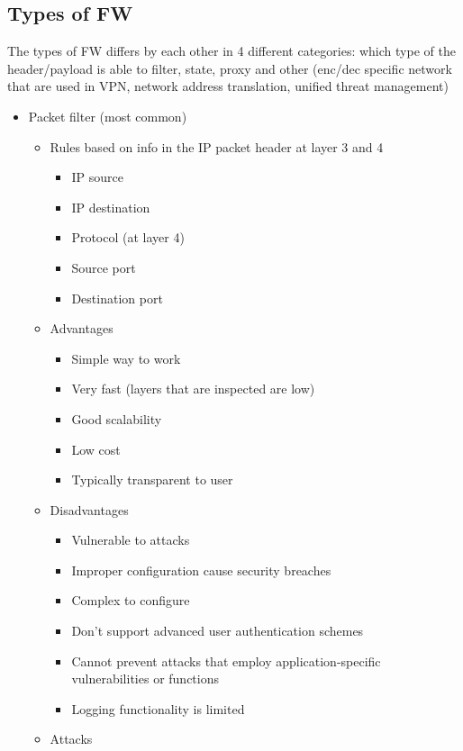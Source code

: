 \documentclass{article}
\begin{document}
\subsection{Types of FW}
The types of FW differs by each other in 4 different categories: which type of the header/payload is able to filter, state, proxy and other (enc/dec specific network that are used in VPN, network address translation, unified threat management)
\begin{itemize}
  \item Packet filter (most common) 
    \begin{itemize}
      \item Rules based on info in the IP packet header at layer 3 and 4
        \begin{itemize}
          \item IP source
          \item IP destination
          \item Protocol (at layer 4)
          \item Source port
          \item Destination port
        \end{itemize}
      \item Advantages
        \begin{itemize}
          \item Simple way to work
          \item Very fast (layers that are inspected are low)
          \item Good scalability
          \item Low cost
          \item Typically transparent to user
        \end{itemize}
      \item Disadvantages
        \begin{itemize}
          \item Vulnerable to attacks 
          \item Improper configuration cause security breaches
          \item Complex to configure
          \item Don’t support advanced user authentication schemes
          \item Cannot prevent attacks that employ application-specific vulnerabilities or functions
          \item Logging functionality is limited
        \end{itemize}
      \item Attacks

\end{itemize}
\end{itemize}
\end{document}
